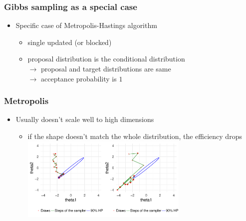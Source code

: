 \documentclass[10pt]{beamer}
\begin{document}
\begin{frame}

\frametitle{Gibbs sampling as a special case}

  \begin{itemize}
  \item Specific case of Metropolis-Hastings algorithm
    \begin{itemize}
    \item single updated (or blocked)
    \item proposal distribution is the conditional distribution\\
      $\rightarrow$ proposal and target distributions are same\\
      $\rightarrow$ acceptance probability is $1$
    \end{itemize}
  \end{itemize}

\end{frame}

\begin{frame}

\frametitle{ Metropolis}

  \begin{itemize}
  \item Usually doesn't scale well to high dimensions
    \begin{itemize}
    \item if the shape doesn't match the whole distribution, the efficiency drops
      \vspace{1\baselineskip}
      \hspace{-1cm}\includegraphics[width=4cm]{figs/Metrop2.pdf}\includegraphics[width=4cm]{figs/Metrop3.pdf}
    \end{itemize}
  \end{itemize}

\end{frame}
\end{document}
